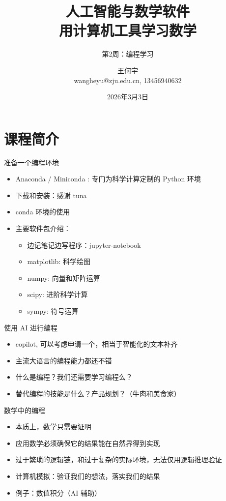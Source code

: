 \documentclass[10pt,aspectratio=169]{beamer}
\title[人工智能与数学软件]{\Large 人工智能与数学软件\\\small 用计算机工具学习数学}
\subtitle{第2周：编程学习}
\author{王何宇 \\ wangheyu@zju.edu.cn, 13456940632}
\institute{浙江大学数学科学学院}
\date{2026年3月3日}
\begin{document}
\begin{frame}[plain]
  \titlepage
\end{frame}

\section{课程简介}
\begin{frame}{准备一个编程环境}
\begin{itemize}
  \item Anaconda / Miniconda : 专门为科学计算定制的 Python 环境
  \item 下载和安装：感谢 tuna 
  \item conda 环境的使用
  \item 主要软件包介绍：
\begin{itemize}
  \item 边记笔记边写程序：jupyter-notebook
  \item matplotlib: 科学绘图
  \item numpy: 向量和矩阵运算
  \item scipy: 进阶科学计算
  \item sympy: 符号运算
\end{itemize}
\end{itemize}
\end{frame}

\begin{frame}{使用 AI 进行编程}
\begin{itemize}
    \item copilot, 可以考虑申请一个，相当于智能化的文本补齐
    \item 主流大语言的编程能力都还不错
    \item 什么是编程？我们还需要学习编程么？
    \item 替代编程的技能是什么？产品规划？（牛肉和美食家）
\end{itemize}
\end{frame}

\begin{frame}{数学中的编程}
    \begin{itemize}
        \item 本质上，数学只需要证明
        \item 应用数学必须确保它的结果能在自然界得到实现
        \item 过于繁琐的逻辑链，和过于复杂的实际环境，无法仅用逻辑推理验证
        \item 计算机模拟：验证我们的想法，落实我们的结果
        \item 例子：数值积分（AI 辅助）
    \end{itemize}
\end{frame}
\end{document}
